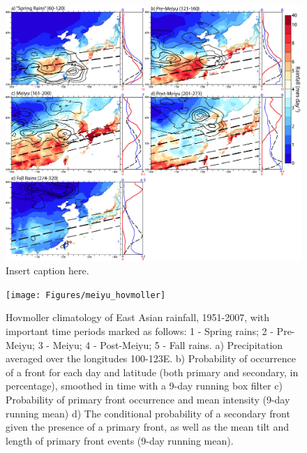 \documentclass[draft,grl]{AGUTeX}
\begin{document}
%
%
%
%
%


\begin{figure}
\label{climo}
\noindent\includegraphics[width=36pc]{Figures/climo}
\caption{Insert caption here.}
\end{figure}

\begin{figure}
\noindent\texttt{[image: Figures/meiyu\_hovmoller]}
\caption{Hovmoller climatology of East Asian rainfall, 1951-2007, with important time periods marked as follows: 1 - Spring rains; 2 - Pre-Meiyu; 3 - Meiyu; 4 - Post-Meiyu; 5 - Fall rains. a) Precipitation averaged over the longitudes 100-123\textdegree E. b) Probability of occurrence of a front for each day and latitude (both primary and secondary, in percentage), smoothed in time with a 9-day running box filter c) Probability of primary front occurrence and mean intensity (9-day running mean) d) The conditional probability of a secondary front given the presence of a primary front, as well as the mean tilt and length of primary front events (9-day running mean).}
\label{dingchan}
\end{figure}
\end{document}
